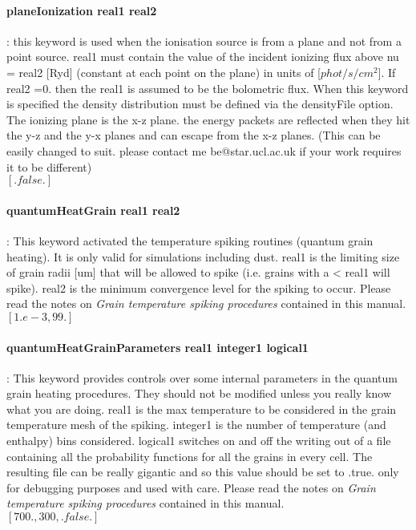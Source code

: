 \documentclass[11pt]{article}
\begin{document}
\paragraph  {  planeIonization real1 real2} : this keyword is used when the ionisation source is from a 
                    plane and not from a point source. real1 must contain the value 
		    of the incident ionizing flux above nu = real2 [Ryd] (constant at each point on the plane) in units of 
		    [$phot/s/cm^2$]. If real2 =0. then the real1 is assumed to be the bolometric flux. 
		    When this keyword is specified the density distribution
		    must be defined via the densityFile option. The ionizing plane is the 
		    x-z plane. the energy packets are reflected when they hit the y-z and
		    the y-x planes and can escape from the x-z planes. (This can be easily 
		    changed to suit. please contact me be@star.ucl.ac.uk if your work requires 
		    it to be different)\\
		    $[.false.]$\\

\paragraph {quantumHeatGrain real1 real2}: This keyword activated the temperature spiking routines (quantum grain heating). It is only valid for simulations including dust. real1 is the limiting size of grain radii [um] that will be allowed to spike (i.e. grains with a < real1 will spike). real2 is the minimum convergence level for the spiking to occur. Please read the notes on {\it Grain temperature spiking procedures} contained in this manual.\\
$[1.e-3, 99.]$\\

\paragraph {quantumHeatGrainParameters real1 integer1 logical1}: This keyword provides controls over some internal parameters in the quantum grain heating procedures. They should not be modified unless you really know what you are doing.  real1 is the max temperature to be considered in the grain temperature mesh of the spiking. integer1  is the number of temperature (and enthalpy) bins considered. logical1 switches on and off the writing out of a file containing all the probability functions for all the grains in every cell. The resulting file can be really gigantic and so this value should be set to .true. only for debugging purposes and used with care. Please read the notes on {\it Grain temperature spiking procedures} contained in this manual.\\
$[700., 300, .false.]$
 
\end{document}
